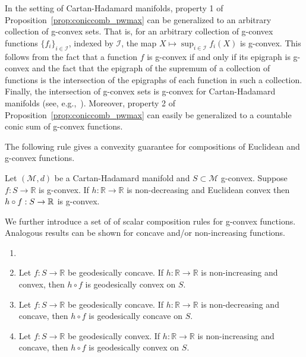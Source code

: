 \documentclass[twoside,11pt]{article}
\begin{document}
{
\begin{remark}
    In the setting of Cartan-Hadamard manifolds, property 1 of Proposition~\ref{prop:coniccomb_pwmax} can be generalized to an arbitrary collection of g-convex sets. That is, for an arbitrary collection of g-convex functions $\{f_i\}_{i \in\mathcal{I}}$, indexed by $\mathcal{I}$, the map $X \mapsto \sup_{i \in \mathcal{I}}f_i(X)$ is g-convex. This follows from the fact that a function $f$ is g-convex if and only if its epigraph is g-convex \citep{bacak2014convex} and the fact that the epigraph of the supremum of a collection of functions is the intersection of the epigraphs of each function in such a collection. Finally, the intersection of g-convex sets is g-convex for Cartan-Hadamard manifolds (see, e.g.,~\citep{boumal2020introduction}).
    Moreover, property 2 of Proposition~\ref{prop:coniccomb_pwmax} can easily be generalized to a countable conic sum of g-convex functions. 
\end{remark}
}

The following rule gives a convexity guarantee for compositions of Euclidean and g-convex functions. 
\begin{prop}\label{prop:ecvx_composition}
     Let $(\mathcal{M}, d)$ be a Cartan-Hadamard manifold and $S \subset \mathcal{M}$ g-convex. Suppose $f: S \rightarrow \mathbb{R}$ is g-convex. If $h: \mathbb{R} \rightarrow \mathbb{R}$ is non-decreasing and Euclidean convex then $h \circ f: S \to \mathbb{R}$ is g-convex.
\end{prop}

We further introduce a set of of scalar composition rules for g-convex functions. Analogous results can be shown for concave and/or non-increasing functions.
\begin{corollary}
        \begin{enumerate}
            \item[]
           \item Let $f: S \rightarrow \mathbb{R}$ be geodesically concave. If $h: \mathbb{R} \rightarrow \mathbb{R}$ is non-increasing and convex, then $h \circ f$ is geodesically convex on $S$.
            \item Let $f: S \rightarrow \mathbb{R}$ be geodesically concave. If $h: \mathbb{R} \rightarrow \mathbb{R}$ is non-decreasing and concave, then $h \circ f$ is geodesically concave on $S$.
            \item Let $f: S \rightarrow \mathbb{R}$ be geodesically convex. If $h: \mathbb{R} \rightarrow \mathbb{R}$ is non-increasing and concave, then $h \circ f$ is geodesically convex on $S$.
        \end{enumerate}
    \end{corollary}
\end{document}
